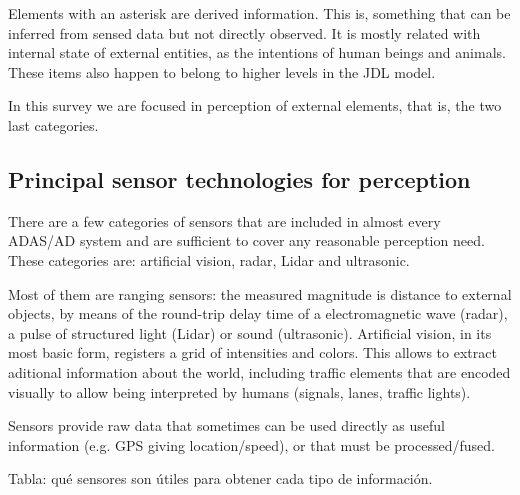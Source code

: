Elements with an asterisk are derived information. This is, something that can 
be inferred from sensed data but not directly observed. It is mostly related 
with internal state of external entities, as the intentions of human beings and 
animals. These items also happen to belong to higher levels in the JDL model.

In this survey we are focused in perception of external elements, that is, the
two last categories.

\subsection{Principal sensor technologies for perception}

There are a few categories of sensors that are included in almost every ADAS/AD
system and are sufficient to cover any reasonable perception need. 
These categories are: artificial vision, radar, Lidar and 
ultrasonic.

Most of them are ranging sensors: the measured magnitude is distance to 
external objects, by means of the round-trip delay time of a electromagnetic 
wave (radar), a pulse of structured light (Lidar) or sound (ultrasonic).
Artificial vision, in its most basic form, registers a grid of intensities and 
colors. This allows to extract aditional information about the world, including 
traffic elements that are encoded visually to allow being interpreted by humans 
(signals, lanes, traffic lights).

Sensors provide raw data that sometimes can be used directly as useful
information (e.g. GPS giving location/speed), or that must be processed/fused.

Tabla: qué sensores son útiles para obtener cada tipo de información.

